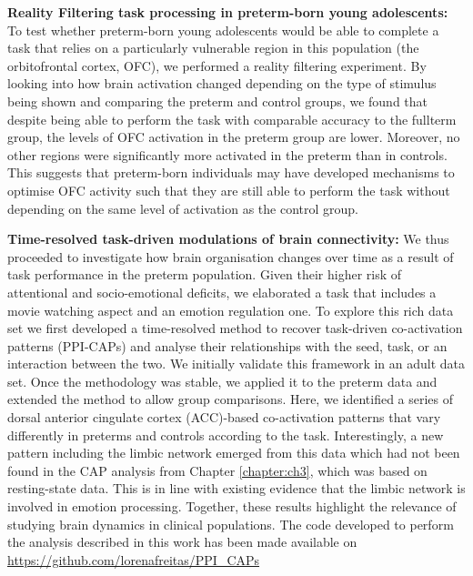 \textbf{Reality Filtering task processing in preterm-born young adolescents:} To test whether pre\-term-born young adolescents would be able to complete a task that relies on a particularly vulnerable region in this population (the orbitofrontal cortex, OFC), we performed a reality filtering experiment. By looking into how brain activation changed depending on the type of stimulus being shown and comparing the preterm and control groups, we found that despite being able to perform the task with comparable accuracy to the fullterm group, the levels of OFC activation in the preterm group are lower. Moreover, no other regions were significantly more activated in the preterm than in controls. This suggests that preterm-born individuals may have developed mechanisms to optimise OFC activity such that they are still able to perform the task without depending on the same level of activation as the control group.


\textbf{Time-resolved task-driven modulations of brain connectivity:}
We thus proceeded to investigate how brain organisation changes over time as a result of task performance in the preterm population. Given their higher risk of attentional and socio-emotional deficits, we elaborated a task that includes a movie watching aspect and an emotion regulation one. To explore this rich data set we first developed a time-resolved method to recover task-driven co-activation patterns (PPI-CAPs) and analyse their relationships with the seed, task, or an interaction between the two. We initially validate this framework in an adult data set. Once the methodology was stable, we applied it to the preterm data and extended the method to allow group comparisons. Here, we identified a series of dorsal anterior cingulate cortex (ACC)-based co-activation patterns that vary differently in preterms and controls according to the task. Interestingly, a new pattern including the limbic network emerged from this data which had not been found in the CAP analysis from Chapter \ref{chapter:ch3}, which was based on resting-state data. This is in line with existing evidence that the limbic network is involved in emotion processing. Together, these results highlight the relevance of studying brain dynamics in clinical populations. The code developed to perform the analysis described in this work has been made available on \url{https://github.com/lorenafreitas/PPI_CAPs}









